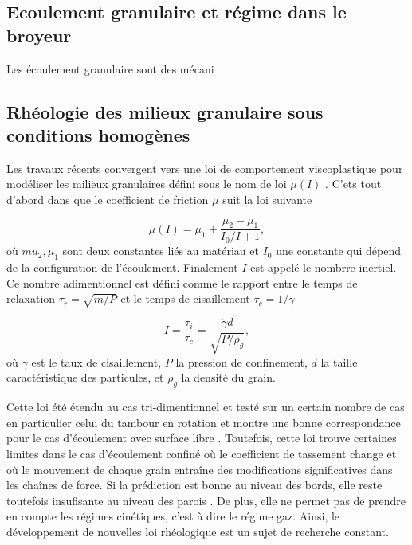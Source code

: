 
\subsection{Ecoulement granulaire et régime dans le broyeur}
Les écoulement granulaire sont des mécani


\subsection{Rhéologie des milieux granulaire sous conditions homogènes}

Les travaux récents convergent vers une loi de comportement viscoplastique pour modéliser les milieux granulaires défini sous le nom de loi $\mu(I)$ \cite{gdr_midi_dense_2004,jop_constitutive_2006}.
C'ets tout d'abord dans \cite{POULIQUEN_FORTERRE_2002} que le coefficient de friction $\mu$ suit la loi suivante

\begin{equation*}
    \mu(I) = \mu_1 + \frac{\mu_2- \mu_1}{I_0/I + 1},
\end{equation*}où $mu_2, \mu_1$ sont deux constantes liés au matériau et $I_0$ une constante qui dépend de la configuration de l'écoulement. Finalement $I$ est appelé le nombrre inertiel. Ce nombre adimentionnel est défini comme le rapport entre le temps de relaxation $\tau_r = \sqrt{m/P}$ et le temps de cisaillement $\tau_c = 1 / \dot \gamma$

\begin{equation*}
    I = \frac{\tau_i}{\tau_c} = \frac{\dot \gamma d}{\sqrt{P/\rho_g}},
\end{equation*}où $\dot \gamma$ est le taux de cisaillement, $P$ la pression de confinement, $d$ la taille caractéristique des particules, et $\rho_g$ la densité du grain.

Cette loi été étendu au cas tri-dimentionnel et testé sur un certain nombre de cas en particulier celui du tambour en rotation \cite{Cortet_2009} et montre une bonne correspondance pour le cas d'écoulement avec surface libre \cite{chou_cross-sectional_2009}. Toutefois, cette loi trouve certaines limites dans le cas d'écoulement confiné où le coefficient de tassement change et où le mouvement de chaque grain entraîne des modifications significatives dans les chaînes de force. Si la prédiction est bonne au niveau des bords, elle reste toutefois insufisante au niveau des parois \cite{Rognon_Miller_Metzger_Einav_2015}.
De plus, elle ne permet pas de prendre en compte les régimes cinétiques, c'est à dire le régime gaz. Ainsi, le développement de nouvelles loi rhéologique est un sujet de recherche constant.

